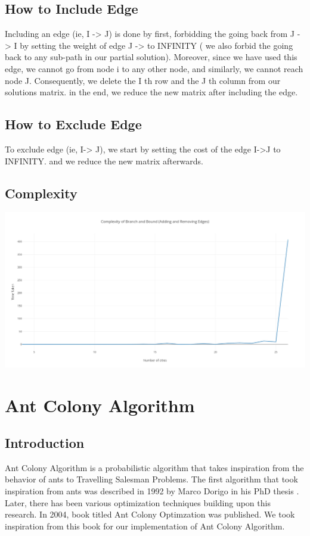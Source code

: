 \documentclass[14pt, english]{article}
\begin{document}
\subsection{How to Include Edge}
Including an edge (ie, I -> J) is done by first, forbidding the going back from J -> I by setting the weight of edge J -> to INFINITY ( we also forbid the going back to any sub-path in our partial solution). Moreover, since we have used this edge, we cannot go from node i to any other node, and similarly, we cannot reach node J. Consequently, we delete the I th row and the J th column from our solutions matrix.
in the end, we reduce the new matrix after including the edge.

\subsection{How to Exclude Edge}
To exclude edge (ie, I-> J), we start by setting the cost of the edge I->J to INFINITY. and we reduce the new matrix afterwards.

\subsection{Complexity}

\begin{center}
\includegraphics[scale=0.3]{branchandbound.png}
\end{center}
\newpage
\section{Ant Colony Algorithm}

\subsection{Introduction}

Ant Colony Algorithm is a probabilistic algorithm that takes inspiration from the behavior of ants to Travelling Salesman Problems. The first algorithm that took inspiration from ants was described in 1992 by Marco Dorigo in his PhD thesis \cite{Dorigothesis}. Later, there has been various optimization techniques building upon this research. In 2004, book titled Ant Colony Optimzation was published. We took inspiration from this book for our implementation of Ant Colony Algorithm.
\end{document}
